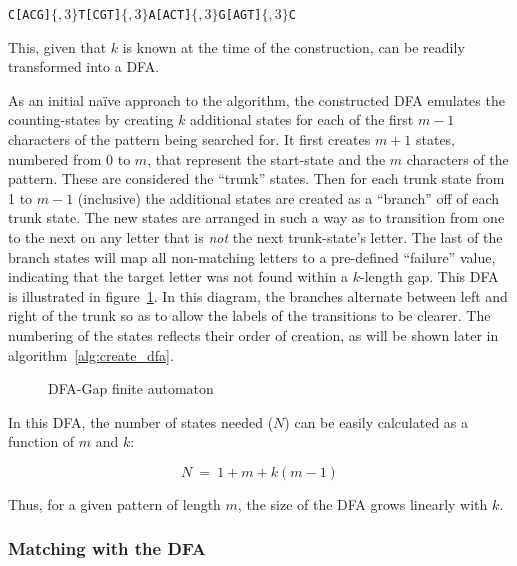 \begin{center}
\texttt{C[ACG]$\lbrace ,3 \rbrace$T[CGT]$\lbrace ,3 \rbrace$A[ACT]$\lbrace ,3 \rbrace$G[AGT]$\lbrace ,3 \rbrace$C}
\end{center}

This, given that $k$ is known at the time of the construction, can be readily transformed into a DFA.

As an initial na\"{i}ve approach to the algorithm, the constructed DFA emulates the counting-states by creating $k$ additional states for each of the first $m - 1$ characters of the pattern being searched for. It first creates $m + 1$ states, numbered from 0 to $m$, that represent the start-state and the $m$ characters of the pattern. These are considered the ``trunk'' states. Then for each trunk state from 1 to $m - 1$ (inclusive) the additional states are created as a ``branch'' off of each trunk state. The new states are arranged in such a way as to transition from one to the next on any letter that is \textit{not} the next trunk-state's letter. The last of the branch states will map all non-matching letters to a pre-defined ``failure'' value, indicating that the target letter was not found within a $k$-length gap. This DFA is illustrated in figure~\ref{fig:dfa_dfa}. In this diagram, the branches alternate between left and right of the trunk so as to allow the labels of the transitions to be clearer. The numbering of the states reflects their order of creation, as will be shown later in algorithm~\ref{alg:create_dfa}.

\begin{figure}[ht]
\centering

\caption{DFA-Gap finite automaton}
\label{fig:dfa_dfa}
\end{figure}

In this DFA, the number of states needed ($N$) can be easily calculated as a function of $m$ and $k$:

\[N~=~1 + m + k(m - 1)\]

Thus, for a given pattern of length $m$, the size of the DFA grows linearly with $k$.

\subsubsection{Matching with the DFA}


